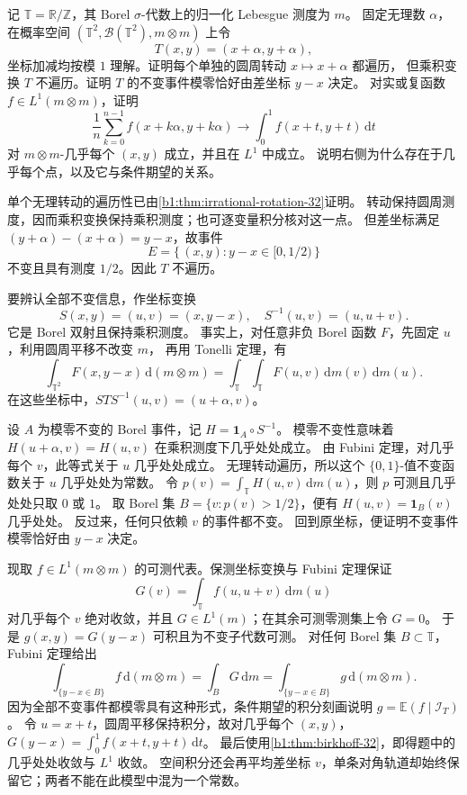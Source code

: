 \begin{optionalexercise}\label{b1:ex:32-product-rotations}
记 \(\mathbb T=\mathbb R/\mathbb Z\)，其 Borel \(\sigma\)-代数上的归一化 Lebesgue 测度为 \(m\)。
固定无理数 \(\alpha\)，在概率空间 \((\mathbb T^2,\mathcal B(\mathbb T^2),m\otimes m)\) 上令
\[
 T(x,y)=(x+\alpha,y+\alpha),
\]
坐标加减均按模 \(1\) 理解。证明每个单独的圆周转动 \(x\mapsto x+\alpha\) 都遍历，
但乘积变换 \(T\) 不遍历。证明 \(T\) 的不变事件模零恰好由差坐标 \(y-x\) 决定。
对实或复函数 \(f\in L^1(m\otimes m)\)，证明
\[
 \frac1n\sum_{k=0}^{n-1}f(x+k\alpha,y+k\alpha)
 \longrightarrow\int_0^1f(x+t,y+t)\,\mathrm dt
\]
对 \(m\otimes m\)-几乎每个 \((x,y)\) 成立，并且在 \(L^1\) 中成立。
说明右侧为什么存在于几乎每个点，以及它与条件期望的关系。
\end{optionalexercise}
\begin{solution}
单个无理转动的遍历性已由\cref{b1:thm:irrational-rotation-32}证明。
转动保持圆周测度，因而乘积变换保持乘积测度；也可逐变量积分核对这一点。
但差坐标满足 \((y+\alpha)-(x+\alpha)=y-x\)，故事件
\[
 E=\{\,(x,y):y-x\in[0,1/2)\,\}
\]
不变且具有测度 \(1/2\)。因此 \(T\) 不遍历。

要辨认全部不变信息，作坐标变换
\[
 S(x,y)=(u,v)=(x,y-x),
 \quad S^{-1}(u,v)=(u,u+v).
\]
它是 Borel 双射且保持乘积测度。
事实上，对任意非负 Borel 函数 \(F\)，先固定 \(u\)，利用圆周平移不改变 \(m\)，
再用 Tonelli 定理，有
\[
 \int_{\mathbb T^2}F(x,y-x)\,\mathrm d(m\otimes m)
 =\int_{\mathbb T}\int_{\mathbb T}F(u,v)\,\mathrm dm(v)\,\mathrm dm(u).
\]
在这些坐标中，\(STS^{-1}(u,v)=(u+\alpha,v)\)。

设 \(A\) 为模零不变的 Borel 事件，记 \(H=\mathbf1_A\circ S^{-1}\)。
模零不变性意味着 \(H(u+\alpha,v)=H(u,v)\) 在乘积测度下几乎处处成立。
由 Fubini 定理，对几乎每个 \(v\)，此等式关于 \(u\) 几乎处处成立。
无理转动遍历，所以这个 \(\{0,1\}\)-值不变函数关于 \(u\) 几乎处处为常数。
令 \(p(v)=\int_{\mathbb T}H(u,v)\,\mathrm dm(u)\)，则 \(p\) 可测且几乎处处只取 \(0\) 或 \(1\)。
取 Borel 集 \(B=\{v:p(v)>1/2\}\)，便有 \(H(u,v)=\mathbf1_B(v)\) 几乎处处。
反过来，任何只依赖 \(v\) 的事件都不变。
回到原坐标，便证明不变事件模零恰好由 \(y-x\) 决定。

现取 \(f\in L^1(m\otimes m)\) 的可测代表。保测坐标变换与 Fubini 定理保证
\[
 G(v)=\int_{\mathbb T}f(u,u+v)\,\mathrm dm(u)
\]
对几乎每个 \(v\) 绝对收敛，并且 \(G\in L^1(m)\)；在其余可测零测集上令 \(G=0\)。
于是 \(g(x,y)=G(y-x)\) 可积且为不变子代数可测。
对任何 Borel 集 \(B\subset\mathbb T\)，Fubini 定理给出
\[
 \int_{\{y-x\in B\}}f\,\mathrm d(m\otimes m)
 =\int_B G\,\mathrm dm
 =\int_{\{y-x\in B\}}g\,\mathrm d(m\otimes m).
\]
因为全部不变事件都模零具有这种形式，条件期望的积分刻画说明
\(g=\mathbb E(f\mid\mathcal I_T)\)。
令 \(u=x+t\)，圆周平移保持积分，故对几乎每个 \((x,y)\)，
\(G(y-x)=\int_0^1 f(x+t,y+t)\,\mathrm dt\)。
最后使用\cref{b1:thm:birkhoff-32}，即得题中的几乎处处收敛与 \(L^1\) 收敛。
空间积分还会再平均差坐标 \(v\)，单条对角轨道却始终保留它；两者不能在此模型中混为一个常数。
\end{solution}

